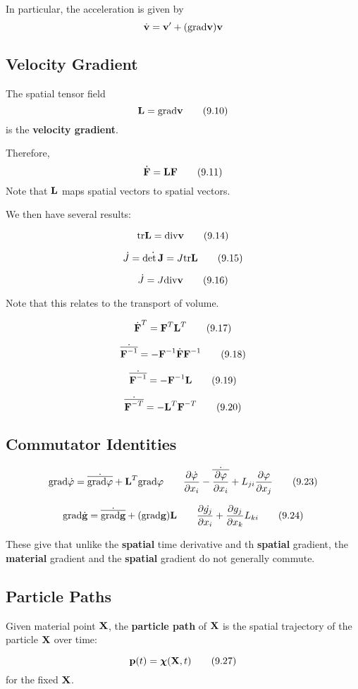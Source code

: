 \documentclass{article}
\newcommand{\Chi}{\boldsymbol{\chi}}
\begin{document}
In particular, the acceleration is given by
\[
	\dot{\textbf{v}} = \textbf{v}^\prime + (\text{grad}\textbf{v})\textbf{v}
\]

\subsection{Velocity Gradient}

The spatial tensor field
\[
	\textbf{L} = \text{grad}\textbf{v}\tag{9.10}
\]
is the \textbf{velocity gradient}.

Therefore,
\[
	\dot{\textbf{F}} = \textbf{L}\textbf{F}\tag{9.11}
\]
Note that $\textbf{L}$ maps spatial vectors to spatial vectors.

We then have several results:


\[
	\text{tr}\textbf{L} = \text{div}\textbf{v}\tag{9.14}
\]

\[
	\dot{J} = \dot{\det\textbf{J}} = J\text{tr}\textbf{L}\tag{9.15}
\]

\[
	\dot{J} = J\text{div}\textbf{v}\tag{9.16}
\]

Note that this relates to the transport of volume.

\[
	\dot{\textbf{F}}^T = \textbf{F}^T\textbf{L}^T\tag{9.17}
\]

\[
	\dot{\overline{\textbf{F}^{-1}}} = -\textbf{F}^{-1}\dot{\textbf{F}}\textbf{F}^{-1}\tag{9.18}
\]

\[
	\dot{\overline{\textbf{F}^{-1}}} = -\textbf{F}^{-1}\textbf{L}\tag{9.19}
\]

\[
	\dot{\overline{\textbf{F}^{-T}}} = -\textbf{L}^T\textbf{F}^{-T}\tag{9.20}
\]


\subsection{Commutator Identities}
\[
	\text{grad}\dot{\varphi} = \dot{\overline{\text{grad}\varphi}} + \textbf{L}^T\text{grad}\varphi \qquad \frac{\partial {\dot{\varphi}}}{\partial {x_i}} - \dot{\overline{\frac{\partial {\varphi}}{\partial {x_i}}}} + L_{ji}\frac{\partial {\varphi}}{\partial {x_j}}\tag{9.23}
\]

\[
	\text{grad}\dot{\textbf{g}} = \dot{\overline{\text{grad}\textbf{g}}} + (\text{grad}\textbf{g})\textbf{L} \qquad \frac{\partial {\dot{g_j}}}{\partial {x_i}} + \frac{\partial {g_j}}{\partial {x_k}}L_{ki}\tag{9.24}
\]

These give that unlike the \textbf{spatial} time derivative and th \textbf{spatial} gradient, the \textbf{material} gradient and the \textbf{spatial} gradient do not generally commute.

\subsection{Particle Paths}
Given material point $\textbf{X}$, the \textbf{particle path} of $\textbf{X}$ is the spatial trajectory of the particle $\textbf{X}$ over time:

\[
	\p(t) = \Chi(\X, t)\tag{9.27}
\]
for the fixed $\textbf{X}$.
\end{document}
